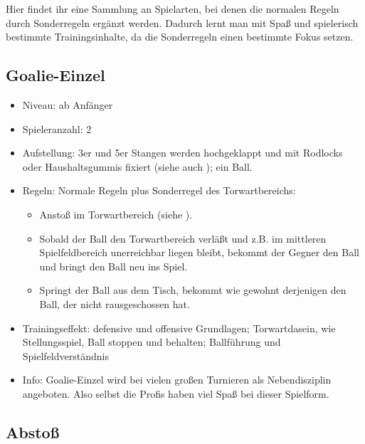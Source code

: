 Hier findet ihr eine Sammlung an Spielarten, bei denen die normalen Regeln durch Sonderregeln ergänzt werden. 
Dadurch lernt man mit Spaß und spielerisch bestimmte Trainingsinhalte, da die Sonderregeln einen bestimmte Fokus setzen. 

\subsection{Goalie-Einzel}
\label{spielformen:sonderregeln:goalie}

\begin{itemize}
\item Niveau: ab Anfänger
\item Spieleranzahl: 2
\item Aufstellung: 3er und 5er Stangen werden hochgeklappt und mit Rodlocks oder Haushaltsgummis fixiert (siehe auch ); ein Ball.
\item Regeln: Normale Regeln plus Sonderregel des Torwartbereichs: 
  \begin{itemize}
  \item Anstoß im Torwartbereich (siehe ).
  \item Sobald der Ball den Torwartbereich verläßt und z.B. im mittleren Spielfeldbereich unerreichbar liegen bleibt, bekommt der Gegner den Ball und bringt den Ball neu ins Spiel.
  \item Springt der Ball aus dem Tisch, bekommt wie gewohnt derjenigen den Ball, der nicht rausgeschossen hat. 
  \end{itemize}
\item Trainingseffekt: defensive und offensive Grundlagen; Torwartdasein, wie Stellungsspiel, Ball stoppen und behalten; Ballführung und Spielfeldverständnis
\item Info: Goalie-Einzel wird bei vielen großen Turnieren als Nebendisziplin angeboten. Also selbst die Profis haben viel Spaß bei dieser Spielform.
\end{itemize}


\subsection{Abstoß}
\label{spielformen:sonderregeln:abstoss}


